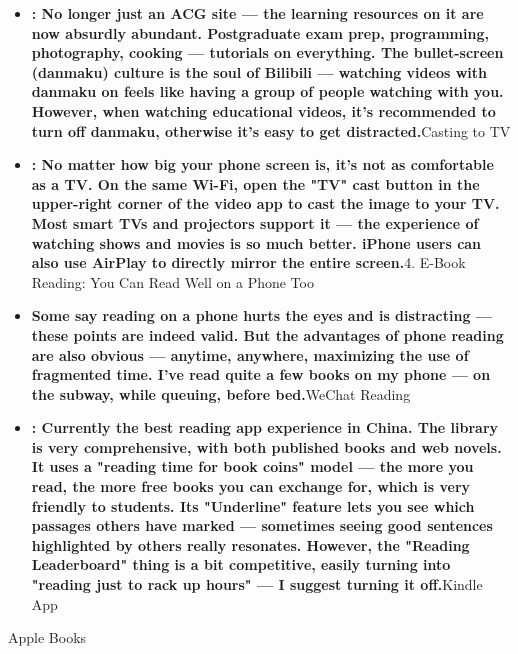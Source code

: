 \begin{itemize}
  \item \textbf{: No longer just an ACG site — the learning resources on it are now absurdly abundant. Postgraduate exam prep, programming, photography, cooking — tutorials on everything. The bullet-screen (danmaku) culture is the soul of Bilibili — watching videos with danmaku on feels like having a group of people watching with you. However, when watching educational videos, it's recommended to turn off danmaku, otherwise it's easy to get distracted.}Casting to TV
  \item \textbf{: No matter how big your phone screen is, it's not as comfortable as a TV. On the same Wi-Fi, open the "TV" cast button in the upper-right corner of the video app to cast the image to your TV. Most smart TVs and projectors support it — the experience of watching shows and movies is so much better. iPhone users can also use AirPlay to directly mirror the entire screen.}4. E-Book Reading: You Can Read Well on a Phone Too
  \item \textbf{Some say reading on a phone hurts the eyes and is distracting — these points are indeed valid. But the advantages of phone reading are also obvious — anytime, anywhere, maximizing the use of fragmented time. I've read quite a few books on my phone — on the subway, while queuing, before bed.}WeChat Reading
  \item \textbf{: Currently the best reading app experience in China. The library is very comprehensive, with both published books and web novels. It uses a "reading time for book coins" model — the more you read, the more free books you can exchange for, which is very friendly to students. Its "Underline" feature lets you see which passages others have marked — sometimes seeing good sentences highlighted by others really resonates. However, the "Reading Leaderboard" thing is a bit competitive, easily turning into "reading just to rack up hours" — I suggest turning it off.}Kindle App
\end{itemize}


Apple Books


